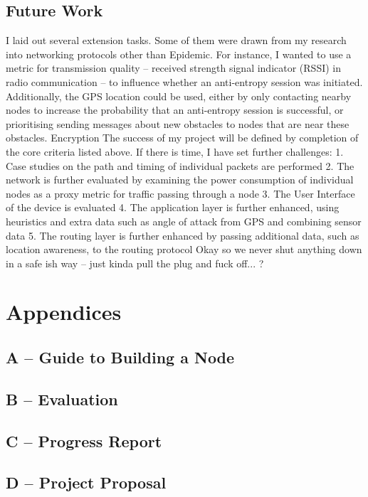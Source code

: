 \documentclass[12pt,a4paper]{report}
\begin{document}
\section{Future Work}
I laid out several extension tasks. Some of them were drawn from my research into networking protocols other than Epidemic. For instance, I wanted to use a metric for transmission quality -- received strength signal indicator (RSSI) in radio communication -- to influence whether an anti-entropy session was initiated. Additionally, the GPS location could be used, either by only contacting nearby nodes to increase the probability that an anti-entropy session is successful, or prioritising sending messages about new obstacles to nodes that are near these obstacles. 
Encryption 
The success of my project will be defined by completion of the core criteria listed above. If there is
time, I have set further challenges:
1. Case studies on the path and timing of individual packets are performed
2. The network is further evaluated by examining the power consumption of individual nodes as
a proxy metric for traffic passing through a node
3. The User Interface of the device is evaluated
4. The application layer is further enhanced, using heuristics and extra data such as angle of
attack from GPS and combining sensor data
5. The routing layer is further enhanced by passing additional data, such as location awareness,
to the routing protocol
Okay so we never shut anything down in a safe ish way -- just kinda pull the plug and fuck off... ?


%


\chapter*{Appendices}

\section*{A -- Guide to Building a Node}
\label{appendixA}
\setcounter{chapter}{0}
\setcounter{figure}{0}

\newpage
\section*{B -- Evaluation}
\label{appendixB}
\setcounter{figure}{0}


\newpage
\section*{C -- Progress Report}
\label{appendixC}
\setcounter{figure}{0}


\newpage
\section*{D -- Project Proposal}
\label{appendixD}
\setcounter{figure}{0}

\end{document}
